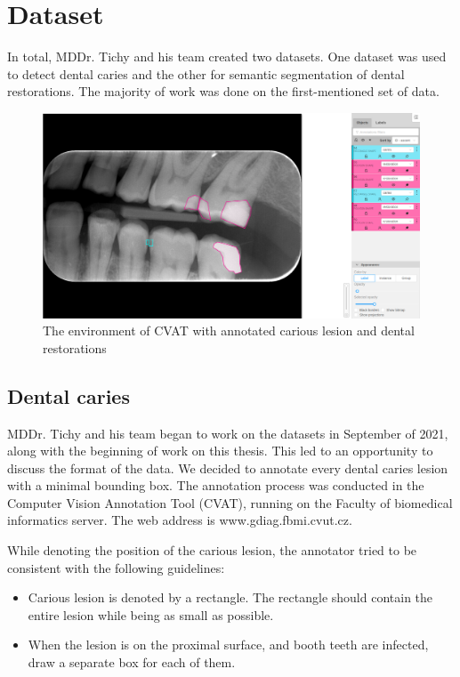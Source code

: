 \chapter{Dataset}
\label{chapter:dataset}
In total,  MDDr. Tichy and his team created two datasets. One dataset was used to detect dental caries and the other for semantic segmentation of dental restorations. The majority of work was done on the first-mentioned set of data.

\begin{figure}
    \centering
    \includegraphics[width=\linewidth]{images/cvat.png}
    \caption{The environment of CVAT with annotated carious lesion and dental restorations}
    \label{fig:cvat}
\end{figure}

\section{Dental caries}
\label{sec:dataset:dental_caries}
MDDr. Tichy and his team began to work on the datasets in September of 2021, along with the beginning of work on this thesis. This led to an opportunity to discuss the format of the data. We decided to annotate every dental caries lesion with a minimal bounding box. The annotation process was conducted in the Computer Vision Annotation Tool (CVAT), running on the Faculty of biomedical informatics server. The web address is www.gdiag.fbmi.cvut.cz.

While denoting the position of the carious lesion, the annotator tried to be consistent with the following guidelines:

\begin{itemize}
    \item Carious lesion is denoted by a rectangle. The rectangle should contain the entire lesion while being as small as possible.
    \item When the lesion is on the proximal surface, and booth teeth are infected, draw a separate box for each of them.
\end{itemize}

